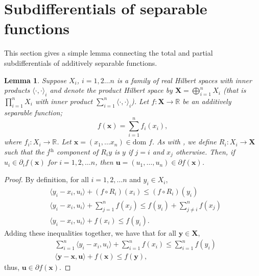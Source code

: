 \documentclass[11pt]{article}
\newtheorem{lemma}{Lemma}
\newcommand\inner[2]{\langle #1, #2 \rangle}
\newcommand{\R}{\mathbb{R}}
\begin{document}
		\section{Subdifferentials of separable functions}
		This section gives a simple lemma connecting the total and partial subdifferentials of additively separable functions.
		\begin{lemma}
			 Suppose $X_i$, $i=1,2\ldots n$ is a family of real Hilbert spaces with inner products $\inner{\cdot}{\cdot}_i$ and denote the product Hilbert space by $\bm{X}=\bigoplus_{i=1}^{n}X_i$ (that is $\prod_{i=1}^{n}X_i$ with inner product $\sum_{i=1}^{n}\inner{\cdot}{\cdot}_i$). Let $f:\bm{X}\to\R$ be an additively separable function;
			\[  f(\bm{x}) = \sum_{i=1}^{n}f_{i}(x_i),
			\]
			where $f_i:X_i\to\R$. Let $\bm{x}=(x_1, \ldots x_n)\in\text{dom }f$. As with \cite{Bauschke2010}, we define $R_i:X_i\to \bm{X}$ such that the j$^{\text{th}}$ component of $R_i y$ is $y$ if $j=i$ and $x_j$ otherwise. Then, if $u_i\in\partial_i f(\bm{x})$ for $i=1,2,\ldots n$, then $\bm{u}=(u_1, \ldots, u_n)\in\partial f(\bm{x})$.
			\end{lemma}
		 \begin{proof}
			By definition, for all $i=1,2,\ldots n$ and $y_i\in X_i$,
			\begin{align*}
				& \inner{y_i - x_i}{u_i} + (f\circ R_i)(x_i)\leq (f\circ R_i)(y_i)\\
				& \inner{y_i - x_i}{u_i} + \sum_{j=1}^{n}f(x_j) \leq f(y_i) + \sum_{j\neq i}^{n}f(x_j) \\
				& \inner{y_i - x_i}{u_i} + f(x_i) \leq f(y_i).
			\end{align*}
			Adding these inequalities together, we have that for all $\bm{y}\in\bm{X}$, 
			\begin{align*}
				& \sum_{i=1}^{n}\inner{y_i - x_i}{u_i} + \sum_{i=1}^{n}f(x_i) \leq \sum_{i=1}^{n}f(y_i) \\
				& \inner{\bm{y} - \bm{x}}{\bm{u}} + f(\bm{x}) \leq f(\bm{y}),
			\end{align*}
			thus, $\bm{u}\in \partial f(\bm{x})$.
		\end{proof}
	\printbibliography
\end{document}
